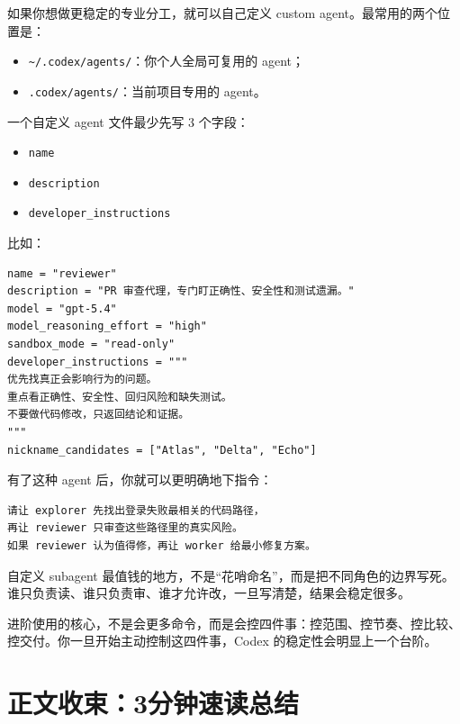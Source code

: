 \documentclass[UTF8,a4paper,12pt]{ctexart}
\begin{document}
如果你想做更稳定的专业分工，就可以自己定义 custom agent。最常用的两个位置是：
\begin{itemize}
  \item \texttt{\textasciitilde/.codex/agents/}：你个人全局可复用的 agent；
  \item \texttt{.codex/agents/}：当前项目专用的 agent。
\end{itemize}

一个自定义 agent 文件最少先写 3 个字段：
\begin{itemize}
  \item \texttt{name}
  \item \texttt{description}
  \item \texttt{developer\_instructions}
\end{itemize}

比如：

\begin{lstlisting}[style=cli]
name = "reviewer"
description = "PR 审查代理，专门盯正确性、安全性和测试遗漏。"
model = "gpt-5.4"
model_reasoning_effort = "high"
sandbox_mode = "read-only"
developer_instructions = """
优先找真正会影响行为的问题。
重点看正确性、安全性、回归风险和缺失测试。
不要做代码修改，只返回结论和证据。
"""
nickname_candidates = ["Atlas", "Delta", "Echo"]
\end{lstlisting}

有了这种 agent 后，你就可以更明确地下指令：

\begin{lstlisting}[style=prompt]
请让 explorer 先找出登录失败最相关的代码路径，
再让 reviewer 只审查这些路径里的真实风险。
如果 reviewer 认为值得修，再让 worker 给最小修复方案。
\end{lstlisting}

\begin{tipbox}
自定义 subagent 最值钱的地方，不是“花哨命名”，而是把不同角色的边界写死。谁只负责读、谁只负责审、谁才允许改，一旦写清楚，结果会稳定很多。
\end{tipbox}

\begin{sumbox}
进阶使用的核心，不是会更多命令，而是会控四件事：控范围、控节奏、控比较、控交付。你一旦开始主动控制这四件事，Codex 的稳定性会明显上一个台阶。
\end{sumbox}

\section{正文收束：3分钟速读总结}
\end{document}
